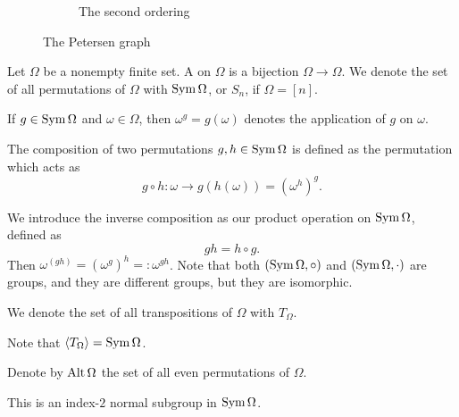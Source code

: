 \begin{figure*}[h!]
\begin{subfigure}{0.4\linewidth}
	\caption{The second ordering}%
	\label{fig:sg-01-petersen-relabeled}
  \end{subfigure}
  \caption{The Petersen graph}
\end{figure*}

\begin{definition}
  Let $\Omega$ be a nonempty finite set.
  A  on $\Omega$ is a bijection $\Omega \to \Omega$.
  We denote the set of all permutations of $\Omega$ with $\operatorname{Sym} \Omega$, or
  $S_n$, if $\Omega = [n]$.
\end{definition}

\begin{definition}
  If $g \in \operatorname{Sym} \Omega$ and $\omega \in \Omega$, then $\omega^g = g(\omega)$
  denotes the application of $g$ on $\omega$.
\end{definition}

\begin{definition}
  The composition of two permutations $g, h \in \operatorname{Sym} \Omega$ is defined as the
  permutation which acts as
  \[
	g \circ h: \omega \to g(h(\omega)) = {(\omega^h)}^g.
  \]
\end{definition}

We introduce the inverse composition as our product operation on $\operatorname{Sym} \Omega$,
defined as
\[
  gh = h \circ g.
\]
Then $\omega^{(g h)} = {(\omega^g)}^h =: \omega^{gh}$.
Note that both $(\operatorname{Sym} \Omega, \circ)$ and $(\operatorname{Sym} \Omega, \cdot)$ are groups, and
they are different groups, but they are isomorphic.

\begin{definition}
  We denote the set of all transpositions of $\Omega$ with $T_\Omega$.
\end{definition}

\begin{remark}
  Note that $\left< T_\Omega \right> = \operatorname{Sym} \Omega$.
\end{remark}

\begin{definition}
  Denote by $\operatorname{Alt} \Omega$ the set of all even permutations of $\Omega$.
\end{definition}

\begin{remark}
  This is an index-$2$ normal subgroup in $\operatorname{Sym} \Omega$.
\end{remark}

